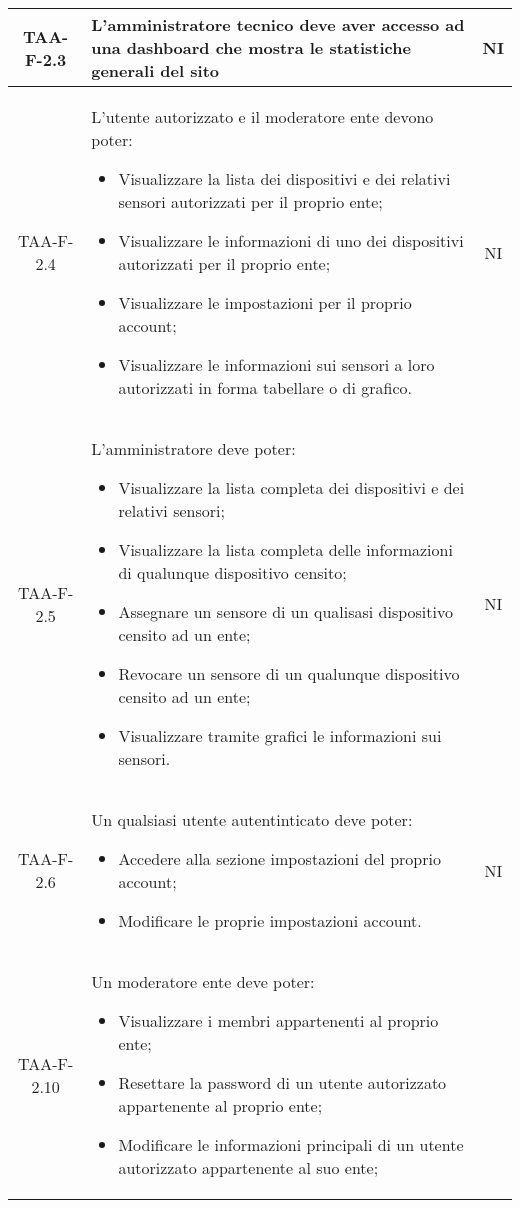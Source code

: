 \begin{center}
\begin{longtable}{|c|p{10cm}|c|}
			 \hline
			 TAA-F-2.3 & L'amministratore tecnico deve aver accesso ad una dashboard che mostra le statistiche generali del sito & NI \\
			 \hline
			 TAA-F-2.4 & L'utente autorizzato e il moderatore ente devono poter:
			 \begin{itemize}
			 	\item Visualizzare la lista dei dispositivi e dei relativi sensori autorizzati per il proprio ente;
			 	\item Visualizzare le informazioni di uno dei dispositivi autorizzati per il proprio ente;
			 	\item Visualizzare le impostazioni per il proprio account;
			 	\item Visualizzare le informazioni sui sensori a loro autorizzati in forma tabellare o di grafico.
			 \end{itemize} & NI \\
			 \hline
			 TAA-F-2.5 & L'amministratore deve poter:
			 \begin{itemize}
			 	\item Visualizzare la lista completa dei dispositivi e dei relativi sensori;
			 	\item Visualizzare la lista completa delle informazioni di qualunque dispositivo censito;
			 	\item Assegnare un sensore di un qualisasi dispositivo censito ad un ente;
			 	\item Revocare un sensore di un qualunque dispositivo censito ad un ente;
			 	\item Visualizzare tramite grafici le informazioni sui sensori.
			 \end{itemize} & NI \\
			 \hline
			 TAA-F-2.6 & Un qualsiasi utente autentinticato deve poter:
			 \begin{itemize}
			 	\item Accedere alla sezione impostazioni del proprio account;
			 	\item Modificare le proprie impostazioni account.
			 \end{itemize} & NI \\
			 \hline
			 TAA-F-2.10 & Un moderatore ente deve poter:
			 \begin{itemize}
			 	\item Visualizzare i membri appartenenti al proprio ente;
			 	\item Resettare la password di un utente autorizzato appartenente al proprio ente;
			 	\item Modificare le informazioni principali di un utente autorizzato appartenente al suo ente;

\end{itemize}
\end{longtable}
\end{center}
